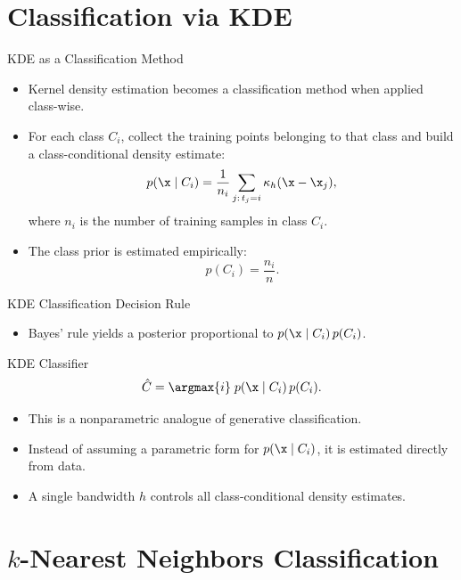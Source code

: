 \section{Classification via KDE}

\begin{frame}{KDE as a Classification Method}
  \begin{itemize}
    \item Kernel density estimation becomes a \alert{classification method} when applied class-wise.
    \item For each class $C_i$, collect the training points belonging to that class and build a class-conditional density estimate:
    \[
      p(\x \mid C_i) = \frac{1}{n_i}\sum_{j:\,t_j=i}\kappa_h(\x-\x_j),
    \]
    where $n_i$ is the number of training samples in class $C_i$.
    \item The class prior is estimated empirically:
    \[
      p(C_i) = \frac{n_i}{n}.
    \]
  \end{itemize}
\end{frame}

\begin{frame}{KDE Classification Decision Rule}
  \begin{itemize}
    \item Bayes' rule yields a posterior proportional to $p(\x \mid C_i)\,p(C_i)$.
  \end{itemize}
  \begin{block}{KDE Classifier}
    \[
      \hat{C} = \argmax{i}\; p(\x \mid C_i)\,p(C_i).
    \]
  \end{block}
  \vspace{0.5em}
  \begin{itemize}
    \item This is a \alert{nonparametric analogue} of generative classification.
    \item Instead of assuming a parametric form for $p(\x \mid C_i)$, it is estimated directly from data.
    \item A single bandwidth $h$ controls all class-conditional density estimates.
  \end{itemize}
\end{frame}

\section{$k$-Nearest Neighbors Classification}

